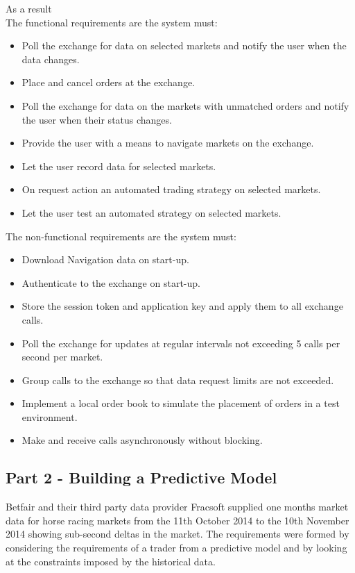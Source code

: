 As a result\\

The functional requirements are the system must:
	\begin{itemize}
		\item Poll the exchange for data on selected markets and notify the user when the data changes.
		\item Place and cancel orders at the exchange.
		\item Poll the exchange for data on the markets with unmatched orders and notify the user when their status changes.
		\item Provide the user with a means to navigate markets on the exchange.
		\item Let the user record data for selected markets.
		\item On request action an automated trading strategy on selected markets.
		\item Let the user test an automated strategy on selected markets.
	\end{itemize}
	
The non-functional requirements are the system must:
	\begin{itemize}
		\item Download Navigation data on start-up.
		\item Authenticate to the exchange on start-up.
		\item Store the session token and application key and apply them to all exchange calls.
		\item Poll the exchange for updates at regular intervals not exceeding 5 calls per second per market.
		\item Group calls to the exchange so that data request limits are not exceeded.
		\item Implement a local order book to simulate the placement of orders in a test environment.
		\item Make and receive calls asynchronously without blocking.
	\end{itemize}
\newpage
\subsection{Part 2 - Building a Predictive Model}
Betfair and their third party data provider Fracsoft supplied one months market data for horse racing markets from the 11th October 2014 to the 10th November 2014 showing sub-second deltas in the market. The requirements were formed by considering the requirements of a trader from a predictive model and by looking at the constraints imposed by the historical data.\\

